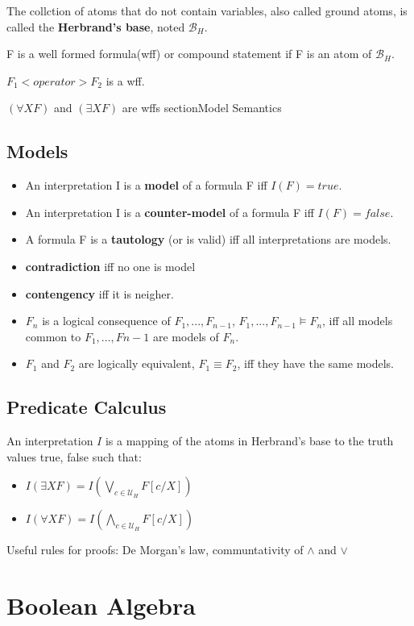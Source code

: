 \documentclass[11pt, twocolumn]{article}
\newenvironment{compactitem}
{\begin{itemize}
  \setlength{\itemsep}{1px}
  \setlength{\parskip}{0pt}
  \setlength{\parsep}{0pt}}
{\end{itemize}}
\begin{document}
The collction of atoms that do not contain variables, also called ground atoms, is called the \textbf{Herbrand's base}, noted $\mathcal{B}_H$.

F is a well formed formula(wff) or compound statement if F is an atom of $\mathcal{B}_H$.

$F_1<operator>F_2$ is a wff.

$(\forall X F)$ and $(\exists X F)$ are wffs
section{Model Semantics}
\subsection{Models}
\begin{compactitem}
\item An interpretation I is a \textbf{model} of a formula F iff $I(F)=true$.
\item An interpretation I is a \textbf{counter-model} of a formula F iff $I(F)=false$.
\item A formula F is a \textbf{tautology} (or is valid) iff all interpretations are models.
\item \textbf{contradiction} iff no one is model
\item \textbf{contengency} iff it is neigher.
\item $F_n$ is a logical consequence of $F_1,...,F_{n-1}$, $F_1,...,F_{n-1}\models F_n$, iff all models common to $F_1,...,F{n-1}$ are models of $F_n$.
\item $F_1$ and $F_2$ are logically equivalent, $F_1\equiv F_2$, iff they have the same models.
\end{compactitem}
\subsection{Predicate Calculus}
An interpretation $I$ is a mapping of the atoms in Herbrand's base to the truth values {true, false} such that:
\begin{compactitem}
\item $I(\exists X  F)=I(\bigvee\limits_{c\in \mathcal{U}_H} F[c/X])$
\item $I(\forall X  F)=I(\bigwedge\limits_{c\in \mathcal{U}_H} F[c/X])$
\end{compactitem}
Useful rules for proofs: De Morgan's law, communtativity of $\land$ and $\lor$
\section{Boolean Algebra}
\end{document}
